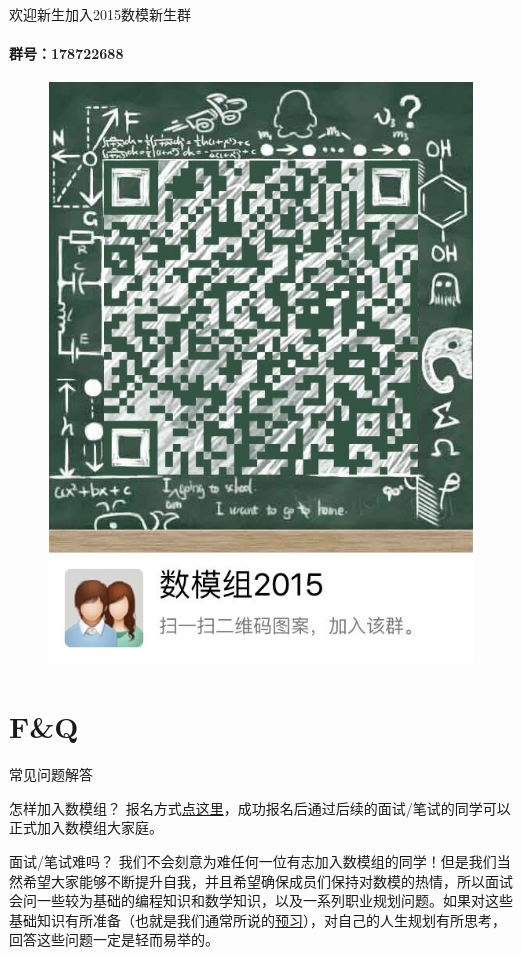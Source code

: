 \documentclass[xcolor={usenames,dvipsnames}]{beamer}
\begin{document}
\begin{frame}{欢迎新生加入2015数模新生群}
\framesubtitle{\faQq 群号：178722688}
	\begin{figure}
		
		\includegraphics[width=.45\textwidth]{qq.jpg}
		\label{qun}
	\end{figure}

\end{frame}

\section{F\&Q}
\begin{frame}{\faQuestionCircle 常见问题解答}
\begin{alertblock}{怎样加入数模组？}
报名方式\textcolor{red}{\hyperlink{signin}{点这里}}，成功报名后通过后续的面试/笔试的同学可以正式加入数模组大家庭。
\end{alertblock}

\begin{block}{面试/笔试难吗？}
我们不会刻意为难任何一位有志加入数模组的同学！但是我们当然希望大家能够不断提升自我，并且希望确保成员们保持对数模的热情，所以面试会问一些较为基础的编程知识和数学知识，以及一系列职业规划问题。如果对这些基础知识有所准备（也就是我们通常所说的\textcolor{blue}{\hyperlink{sec:preview}{预习}}），对自己的人生规划有所思考，回答这些问题一定是轻而易举的。

\end{block}

\end{frame}
\end{document}
